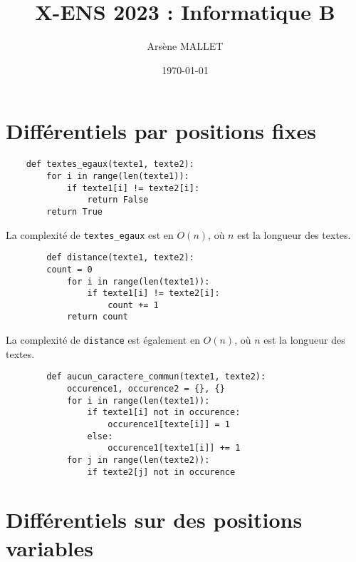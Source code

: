 \documentclass{article}
\title{X-ENS 2023 : Informatique B}
\date{\today}
\author{Arsène MALLET}
\begin{document}
\thispagestyle{firstpage}

\begin{center}
    \huge\bfseries{\@title}
\end{center}

\section{Différentiels par positions fixes}

\begin{question}
    \item
    \begin{verbatim}
    def textes_egaux(texte1, texte2):
        for i in range(len(texte1)):
            if texte1[i] != texte2[i]:
                return False
        return True
    \end{verbatim}

    La complexité de \verb|textes_egaux| est en $O(n)$, où $n$ est la
    longueur des textes.

    \item
    \begin{verbatim}
        def distance(texte1, texte2):
        count = 0
            for i in range(len(texte1)):
                if texte1[i] != texte2[i]:
                    count += 1
            return count
        \end{verbatim}
    
        La complexité de \verb|distance| est également en $O(n)$, où $n$ est la
        longueur des textes.
    \item
    \begin{verbatim}
        def aucun_caractere_commun(texte1, texte2):
            occurence1, occurence2 = {}, {}
            for i in range(len(texte1)):
                if texte1[i] not in occurence:
                    occurence1[texte[i]] = 1
                else:
                    occurence1[texte1[i]] += 1
            for j in range(len(texte2)):
                if texte2[j] not in occurence  
    \end{verbatim}
\end{question}

\section{Différentiels sur des positions variables}

\begin{question}
    \item
\end{question}
\end{document}
